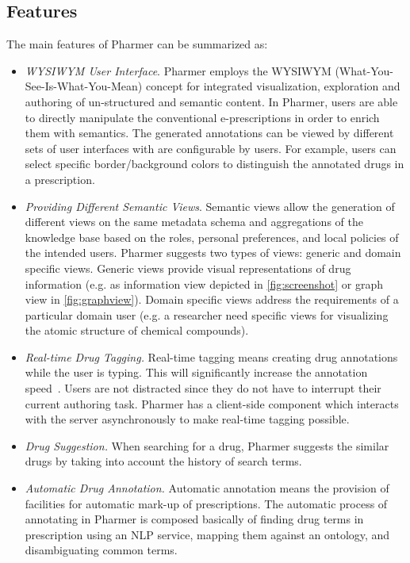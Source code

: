 \documentclass[journal]{IEEEtran}
\begin{document}
\subsection{Features}
The main features of Pharmer can be summarized as:
\begin{itemize}
    \item \emph{WYSIWYM User Interface}.
    Pharmer employs the WYSIWYM (What-You-See-Is-What-You-Mean) concept for integrated visualization, exploration and authoring of un-structured and semantic content.
    In Pharmer, users are able to directly manipulate the conventional e-prescriptions in order to enrich them with semantics.
    The generated annotations can be viewed by different sets of user interfaces with are configurable by users.
    For example, users can select specific border/background colors to distinguish the annotated drugs in a prescription.
	\item \emph{Providing Different Semantic Views}.
	Semantic views allow the generation of different views on the same metadata schema and aggregations of the knowledge base based on the roles, personal preferences, and local policies of the intended users.
	Pharmer suggests two types of views: generic and domain specific views.
	Generic views provide visual representations of drug information (e.g. as information view depicted in \autoref{fig:screenshot} or graph view in \autoref{fig:graphview}).
	Domain specific views address the requirements of a particular domain user (e.g. a researcher need specific views for visualizing the atomic structure of chemical compounds).
	\item \emph{Real-time Drug Tagging.}
	Real-time tagging means creating drug annotations while the user is typing.
	This will significantly increase the annotation speed~\cite{OCA}.
	Users are not distracted since they do not have to interrupt their current authoring task.
	Pharmer has a client-side component which interacts with the server asynchronously to make real-time tagging possible.
	\item \emph{Drug Suggestion.}
		When searching for a drug, Pharmer suggests the similar drugs by taking into account the history of search terms.
    \item \emph{Automatic Drug Annotation.}
    Automatic annotation means the provision of facilities for automatic mark-up of prescriptions.
    The automatic process of annotating in Pharmer is composed basically of finding drug terms in prescription using an NLP service, mapping them against an ontology, and disambiguating common terms.
\end{itemize}
\end{document}
